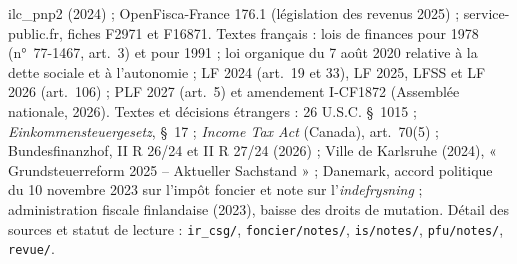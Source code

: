 \documentclass[11pt,a4paper]{article}
\begin{document}
{ilc\_pnp2 (2024) ; OpenFisca-France 176.1 (législation des revenus 2025) ; service-public.fr, fiches F2971 et F16871.
Textes français : lois de finances pour 1978 (n°~77-1467, art.~3) et pour 1991 ; loi organique du 7 août 2020 relative
à la dette sociale et à l'autonomie ; LF 2024 (art.~19 et 33), LF 2025, LFSS et LF 2026 (art.~106) ; PLF 2027 (art.~5) et
amendement I-CF1872 (Assemblée nationale, 2026).
Textes et décisions étrangers : 26 U.S.C. §~1015 ; \emph{Einkommensteuergesetz}, §~17 ; \emph{Income Tax Act} (Canada),
art.~70(5) ; Bundesfinanzhof, II R 26/24 et II R 27/24 (2026) ; Ville de Karlsruhe (2024), « Grundsteuerreform 2025 --
Aktueller Sachstand » ; Danemark, accord politique du 10 novembre 2023 sur l'impôt foncier et note sur
l'\emph{indefrysning} ; administration fiscale finlandaise (2023), baisse des droits de mutation.
Détail des sources et statut de lecture : \texttt{ir\_csg/}, \texttt{foncier/notes/}, \texttt{is/notes/},
\texttt{pfu/notes/}, \texttt{revue/}.\par}
\end{document}
